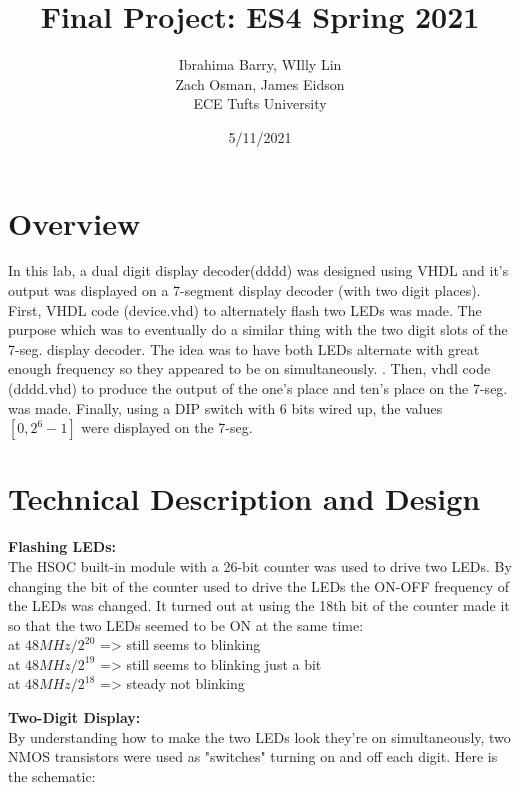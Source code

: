 \documentclass[12pt]{article}
\title{Final Project: ES4 Spring 2021}
\date{5/11/2021}
\author{Ibrahima Barry, WIlly Lin \\ Zach Osman, James Eidson \\ ECE Tufts University}
\begin{document}
\maketitle

\begin{flushleft}

\section{Overview}

In this lab, a dual digit display decoder(dddd) was designed using VHDL and it's output was
displayed on a 7-segment display decoder (with two digit places). First, VHDL
code (device.vhd) to alternately flash two LEDs was made. The purpose which was to eventually
do a similar thing with the two digit slots of the 7-seg. display decoder. The
idea was to have both LEDs alternate with great enough frequency so they
appeared to be on simultaneously. . Then, vhdl code (dddd.vhd) to produce the output of
the one's place and ten's place on the 7-seg. was made. Finally, using a DIP
switch with 6 bits wired up, the values $[0, 2^6 - 1]$ were displayed on the 7-seg.  


\section{Technical Description and Design}
\textbf{Flashing LEDs:}\\
The HSOC built-in module with a 26-bit counter was used to drive two LEDs. By
changing the bit of the counter used to drive the LEDs the ON-OFF frequency of
the LEDs was changed. It turned out at using the 18th bit of the counter made it
so that the two LEDs seemed to be ON at the same time:  \\

at $48MHz/2^{20}$ => still seems to blinking \\
at $48MHz/2^{19}$ => still seems to blinking just a bit \\
at $48MHz/2^{18}$ => steady not blinking \\

\hfill \break

\textbf{Two-Digit Display:}\\
By understanding how to make the two LEDs look they're on simultaneously, two
NMOS transistors were used as "switches" turning on and off each digit.
Here is the schematic: \\



\end{flushleft}
\end{document}
